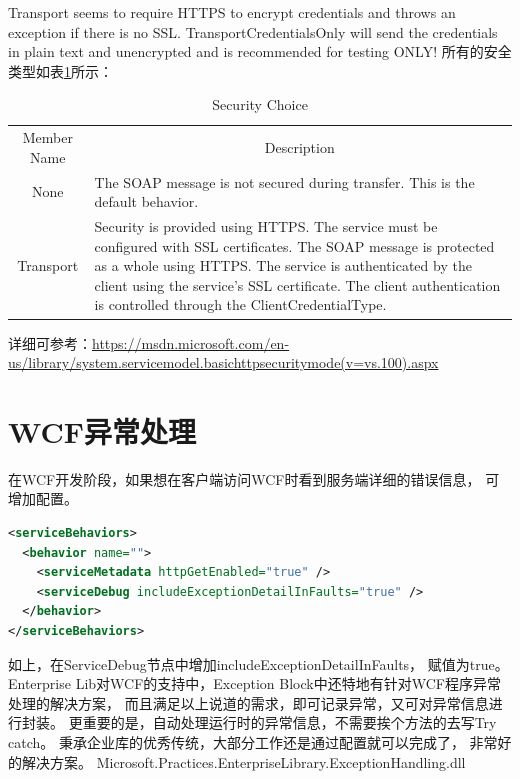 \documentclass{book}
\begin{document}
Transport seems to require HTTPS to encrypt credentials and throws an exception if there is no SSL. 
TransportCredentialsOnly will send the credentials in plain text and unencrypted and is recommended for testing ONLY!
所有的安全类型如表\ref{table:WebServiceSecurityChoice}所示：

\begin{table}\caption[Web Service Security Choice]{Security Choice}
	\label{table:WebServiceSecurityChoice}					
	\medskip
	\centering		
	\begin{tabular}{|c|p{10cm}|}
		\hline
		\multirow{1}{*}{Member Name}		
		& \multicolumn{1}{c|}{Description}\\			
		\cline{1-2}
		None &  The SOAP message is not secured during transfer. This is the default behavior.\\
		\hline
		Transport &  Security is provided using HTTPS. The service must be configured with SSL certificates. The SOAP message is protected as a whole using HTTPS. The service is authenticated by the client using the service’s SSL certificate. The client authentication is controlled through the ClientCredentialType.\\
		\hline	
	\end{tabular}
\end{table}

详细可参考：\url{https://msdn.microsoft.com/en-us/library/system.servicemodel.basichttpsecuritymode(v=vs.100).aspx}

\section{WCF异常处理}

在WCF开发阶段，如果想在客户端访问WCF时看到服务端详细的错误信息，
可增加配置。

\begin{lstlisting}[language=XML]
<serviceBehaviors>
  <behavior name="">
    <serviceMetadata httpGetEnabled="true" />
    <serviceDebug includeExceptionDetailInFaults="true" />
  </behavior>
</serviceBehaviors>
\end{lstlisting}

如上，在ServiceDebug节点中增加includeExceptionDetailInFaults， 赋值为true。
Enterprise Lib对WCF的支持中，Exception Block中还特地有针对WCF程序异常处理的解决方案，
而且满足以上说道的需求，即可记录异常，又可对异常信息进行封装。
更重要的是，自动处理运行时的异常信息，不需要挨个方法的去写Try catch。
秉承企业库的优秀传统，大部分工作还是通过配置就可以完成了，
非常好的解决方案。
Microsoft.Practices.EnterpriseLibrary.ExceptionHandling.dll
\end{document}
